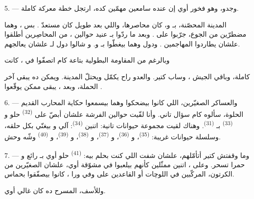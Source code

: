 5. --- وجدو، وهو فخور أوي إن عنده سامعين مهمّين كده، ارتجل خطة معركة كاملة.

المدينة المحصّنة، بـ و، كان 
محاصرها، واللي بعد  طويل كان مستعدّ . بس
، وهما مضطرّين من الجوع، جرّبوا  على
 . وبعد ما ردّوا  بـ
عنيد حوالين ،  من المحاصِرين أطلقوا
 علشان يطاردوا المهاجمين . ودول
 وهما بيغطّوا  بـ
و. و شالوا دول لـ
علشان  يعالجهم.

وبالرغم من المقاومة البطولية بتاعة كام  اتصفّوا في ،
 كانت

كاملة، وباقي الجيش ، وساب  كتير. والعدو راح يكمّل
 ويحتلّ المدينة. ويمكن ده يبقى آخر الحملة، وبعد ، يبقى
ممكن يوقّعوا .

\VUsaut{4.4mm}
\VUsaut{2.8mm}

6. --- والعساكر الصغيّرين، اللي كانوا بيضحكوا وهما بيسمعوا حكاية المحارب القديم
الحلوة، سألوه كام سؤال تاني. وأنا لفّيت حوالين الفرشة علشان أبصّ على
 \textsuperscript{(32)} حلو و \textsuperscript{(33)}
بـ \textsuperscript{(31)}. وهناك لقيت مجموعة حيوانات تانية: اتنين
 \textsuperscript{(34)}:  آلي و
بيغنّي بكل حلقه، وسلسلة حيوانات غريبة:  \textsuperscript{(35)}،
و \textsuperscript{(36)}، و \textsuperscript{(37)}،
و \textsuperscript{(38)}، و \textsuperscript{(39)}،
و \textsuperscript{(40)} وشّه وحش.

7. --- وما وقفتش كتير أتأمّلهم، علشان شفت اللي كنت بحلم بيه: 
\textsuperscript{(41)} حلو أوي بـ رائع و حمرا تسحر.
وعلى ، اتنين ممثّلين كأنهم بيلعبوا  في
 مشوّقة أوي، علشان  الصغيّرين من الكرتون،
المركّبين في اللوچات أو القاعدين على  وفي  ورا
، كانوا بيصفّقوا بحماس.

وللأسف، المسرح ده كان غالي أوي.

